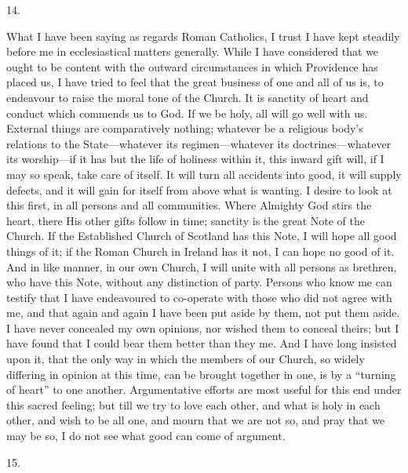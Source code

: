 14.

What I have been saying as regards Roman
Catholics, I trust I have kept steadily before me in ecclesiastical
matters generally. While I have considered that we ought to be content
with the outward circumstances in which Providence has placed us, I
have tried to feel that the great business of one and all of us is, to
endeavour to raise the moral tone of the Church. It is sanctity of
heart and conduct which commends us to God. If we be holy, all will go
well with us. External things are comparatively nothing; whatever be a
religious body's relations to the State—whatever its
regimen—whatever its doctrines—whatever its worship—if it has
but the life of holiness within it, this inward gift will, if I may so
speak, take care of itself. It will turn all accidents into good, it
will supply defects, and it will gain for itself from above what is
wanting. I desire to look at this first, in all persons and all
communities. Where Almighty God stirs the heart, there His other gifts
follow in time; sanctity is the great Note of the Church. If the
Established Church of Scotland has this Note, I will hope all good
things of it; if the Roman Church in Ireland has it not, I can hope no
good of it. And in like manner, in our own Church, I will unite with
all persons as brethren, who have this Note, without any distinction
of party. Persons who know me can testify that I have endeavoured to
co-operate with those who did not agree with me, and that again and
again I have been put aside by them, not put them aside. I have never
concealed my own opinions, nor wished them to conceal theirs; but I
have found that I could bear them better than they me. And I have long
insisted upon it, that the only way in which the members of our
Church, so widely differing in opinion at this time, can be brought
together in one, is by a ``turning of heart'' to one another.
Argumentative efforts are most useful for this end under this sacred
feeling; but till we try to love each other, and what is holy in each
other, and wish to be all one, and mourn that we are not so, and pray
that we may be so, I do not see what good can come of argument.

15.

